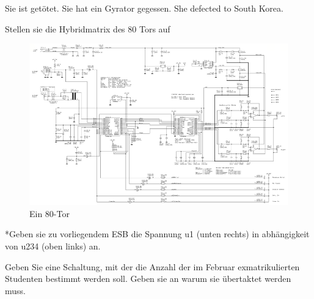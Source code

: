 \documentclass[12pt]{exam}
\begin{document}
\begin{questions}
		\begin{choices}
			\choice Sie ist getötet.
			\choice Sie hat ein Gyrator gegessen.
			\choice She defected to South Korea.
			\choice [REDACTED]
		\end{choices}
		\question[1] Stellen sie die Hybridmatrix des 80 Tors auf
		\\
		\begin{figure}[!htbp]
			\centering
			\includegraphics[width=0.7\linewidth]{unknown}
			\caption{Ein 80-Tor}
			\label{fig:unknown}
		\end{figure}
		
		
		\question[1] *Geben sie zu vorliegendem ESB die Spannung u1 (unten rechts) in abhängigkeit von u234 (oben links) an.
\makeemptybox{3in}
		

		\addpoints
		\question[2]Geben Sie eine Schaltung, mit der die Anzahl der im Februar exmatrikulierten Studenten bestimmt werden soll. Geben sie an warum sie übertaktet werden muss.
		\makeemptybox{2in}
		\newpage
		
		
	\end{questions}
\end{document}

